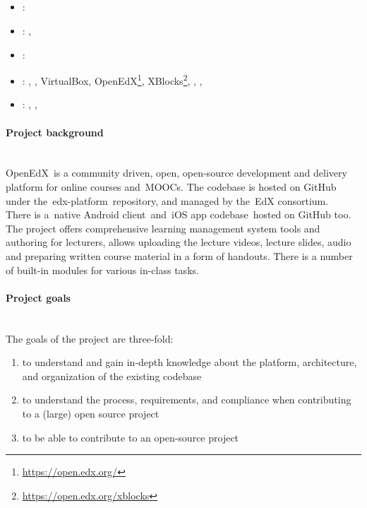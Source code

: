 \label{sec:section5}

\subsection[Global Software Development]{}
\label{sec:glob_soft_dev}
\begin{itemize} 
	\item {}: 
	\item {}: , 
	\item {}: 
	\item {}: , , VirtualBox, OpenEdX\footnote{\url{https://open.edx.org/}}, XBlocks\footnote{\url{https://open.edx.org/xblocks}}, 
	, , 
	\item {}: , , 
\end{itemize} 
\paragraph{Project background} ~\\
OpenEdX is a community driven, open, open-source development and delivery platform for online courses and MOOCs. 
The codebase is hosted on GitHub under the edx-platform repository, and managed by the EdX consortium.  
There is a native Android client and iOS app codebase hosted on GitHub too. 
The project offers comprehensive learning management system tools and authoring for lecturers, allows uploading the lecture videos, lecture slides, 
audio and preparing written course material in a form of handouts. 
There is a number of built-in modules for various in-class tasks.

\paragraph{Project goals} ~\\
The goals of the project are three-fold:
\begin{enumerate}
	\item to understand and gain in-depth knowledge about the platform, architecture, and organization of the existing codebase
	\item to understand the process, requirements, and compliance when contributing to a (large) open source project
	\item to be able to contribute to an open-source project
\end{enumerate}

